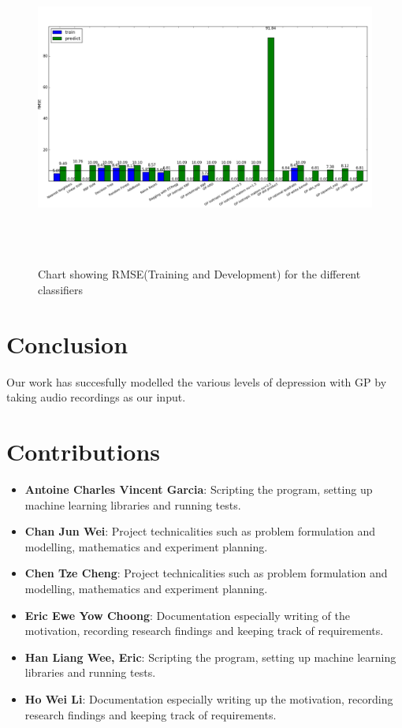\documentclass{article}
\begin{document}
	\begin{figure}
	\includegraphics[height=105mm, keepaspectratio]{results}
	\caption{Chart showing RMSE(Training and Development) for the different classifiers}
	\label{rmse_results_chart}
	\end{figure}

	\newpage
	\section{Conclusion}	
	Our work has succesfully modelled the various levels of depression with GP by taking audio recordings as our input. \\
	
	\section{Contributions}
	\begin{itemize}
		\item \textbf{Antoine Charles Vincent Garcia}: 
		Scripting the program, setting up machine learning libraries and running tests.
		\item \textbf{Chan Jun Wei}: 
		Project technicalities such as problem formulation and modelling, mathematics and experiment planning.
		\item \textbf{Chen Tze Cheng}: 
		Project technicalities such as problem formulation and modelling, mathematics and experiment planning.
		\item \textbf{Eric Ewe Yow Choong}: 
		Documentation especially writing of the motivation, recording research findings and keeping track of requirements.
		\item \textbf{Han Liang Wee, Eric}: 
		Scripting the program, setting up machine learning libraries and running tests.
		\item \textbf{Ho Wei Li}: 
		Documentation especially writing up the motivation, recording research findings and keeping track of requirements.
	\end{itemize}
	
	
	
\end{document}

